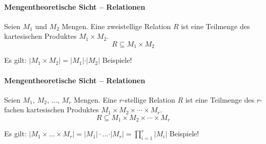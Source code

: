 \begin{frame}{\insertsection}
\framesubtitle{Mengentheoretische Sicht -- Relationen}
\begin{definition}
	Seien $M_1$ und $M_2$ Mengen. Eine zweistellige Relation $R$ ist eine Teilmenge des kartesischen Produktes $M_1\times M_2$.
\begin{equation*} 
R \subseteq M_1 \times M_2
\end{equation*} 
\end{definition}
\abs 
Es gilt: $\vert M_1\times M_2\vert = \vert M_1\vert\cdot \vert M_2\vert$
\abs\abs
\alert{Beispiele!}
\end{frame}

\begin{frame}{\insertsection}
\framesubtitle{Mengentheoretische Sicht -- Relationen}
\begin{definition}
Seien $M_1$, $M_2$, $\ldots$, $M_r$ Mengen. Eine $r$-stellige Relation $R$ ist eine Teilmenge des $r$-fachen 
kartesischen Produktes $M_1 \times M_2 \times \cdots \times M_r$.
\begin{equation*} 
R \subseteq M_1 \times M_2 \times \cdots \times M_r
\end{equation*} 
\end{definition}
\abs 
Es gilt: $\vert M_1\times \ldots \times M_r\vert = \vert M_1\vert\cdot\ldots\cdot \vert M_r\vert =\prod_{i=1}^r\vert M_i\vert$
\abs\abs
\alert{Beispiele!}
\end{frame}

